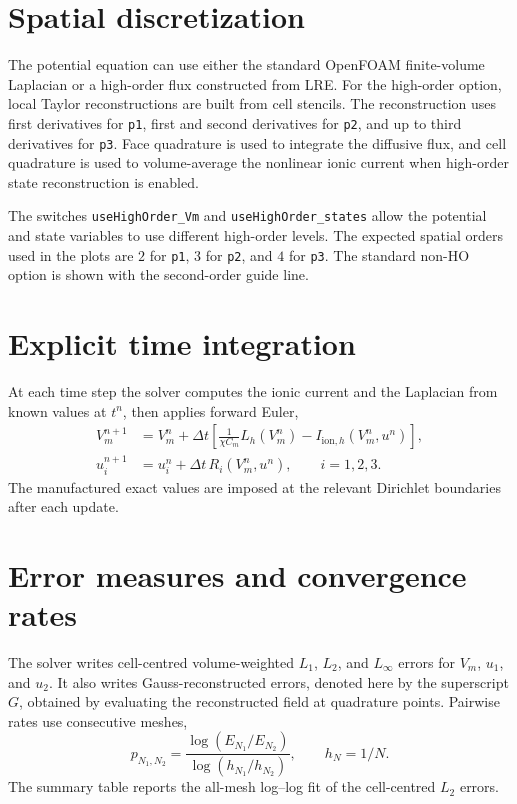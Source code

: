 \documentclass[11pt,a4paper]{article}
\newcommand{\code}[1]{\texttt{#1}}
\begin{document}
\section{Spatial discretization}
The potential equation can use either the standard OpenFOAM finite-volume Laplacian or a high-order flux constructed from LRE. For the high-order option, local Taylor reconstructions are built from cell stencils. The reconstruction uses first derivatives for \code{p1}, first and second derivatives for \code{p2}, and up to third derivatives for \code{p3}. Face quadrature is used to integrate the diffusive flux, and cell quadrature is used to volume-average the nonlinear ionic current when high-order state reconstruction is enabled.

The switches \code{useHighOrder\_Vm} and \code{useHighOrder\_states} allow the potential and state variables to use different high-order levels. The expected spatial orders used in the plots are $2$ for \code{p1}, $3$ for \code{p2}, and $4$ for \code{p3}. The standard non-HO option is shown with the second-order guide line.

\section{Explicit time integration}
At each time step the solver computes the ionic current and the Laplacian from known values at $t^n$, then applies forward Euler,
\begin{align}
V_m^{n+1} &= V_m^n + \Delta t\left[\frac{1}{\chi C_m}L_h(V_m^n)-I_{\mathrm{ion},h}(V_m^n,u^n)\right],\\
u_i^{n+1} &= u_i^n + \Delta t\,R_i(V_m^n,u^n),\qquad i=1,2,3.
\end{align}
The manufactured exact values are imposed at the relevant Dirichlet boundaries after each update.

\section{Error measures and convergence rates}
The solver writes cell-centred volume-weighted $L_1$, $L_2$, and $L_\infty$ errors for $V_m$, $u_1$, and $u_2$. It also writes Gauss-reconstructed errors, denoted here by the superscript $G$, obtained by evaluating the reconstructed field at quadrature points. Pairwise rates use consecutive meshes,
\begin{equation}
p_{N_1,N_2}=\frac{\log(E_{N_1}/E_{N_2})}{\log(h_{N_1}/h_{N_2})}, \qquad h_N = 1/N.
\end{equation}
The summary table reports the all-mesh log--log fit of the cell-centred $L_2$ errors.
\end{document}
